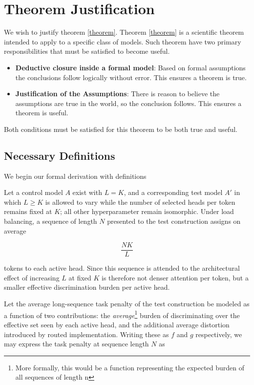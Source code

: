 \documentclass[11pt]{article}
\begin{document}
\appendix


\section{Theorem Justification}
\label{app:proof}

We wish to justify theorem \ref{theorem}. Theorem \ref{theorem} is a scientific theorem intended to apply to a specific class of models. Such theorem have two primary responsibilities that must be satisfied to become useful.

\begin{itemize}
    \item \textbf{Deductive closure inside a formal model}: Based on formal assumptions the conclusions follow logically without error. This ensures a theorem is true.
    \item \textbf{Justification of the Assumptions}: There is reason to believe the assumptions are true in the world, so the conclusion follows. This ensures a theorem is useful.
\end{itemize}

Both conditions must be satisfied for this theorem to be both true and useful.


\subsection{Necessary Definitions}

We begin our formal derivation with definitions

Let a control model $A$ exist with $L=K$, and a corresponding test model $A'$ in which $L\ge K$ is allowed to vary while the number of selected heads per token remains fixed at $K$; all other hyperparameter remain isomorphic. Under load balancing, a sequence of length $N$ presented to the test construction assigns on average

\begin{equation}
\frac{NK}{L}
\end{equation}

tokens to each active head. Since this sequence is attended to the architectural effect of increasing $L$ at fixed $K$ is therefore not denser attention per token, but a smaller effective discrimination burden per active head.

Let the average long-sequence task penalty of the test construction be modeled as a function of two contributions: the \emph{average}\footnote{More formally, this would be a function representing the expected burden of all sequences of length n} burden of discriminating over the effective set seen by each active head, and the additional average distortion introduced by routed implementation. Writing these as $f$ and $g$ respectively, we may express the task penalty at sequence length $N$ as
\end{document}
